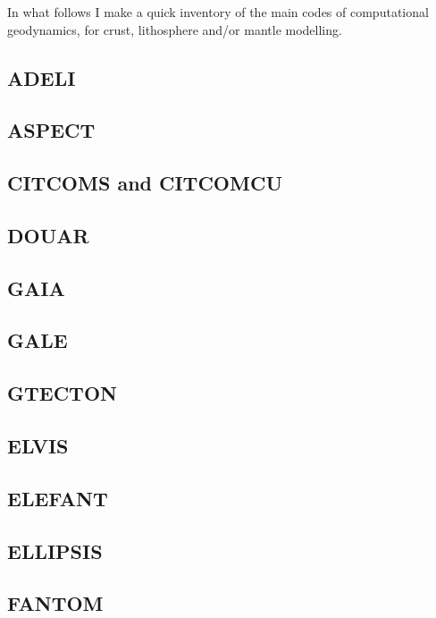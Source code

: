 
In what follows I make a quick inventory of the main codes of computational geodynamics, 
for crust, lithosphere and/or mantle modelling.

\subsection{ADELI}

\subsection{ASPECT}

\subsection{CITCOMS and CITCOMCU}

\subsection{DOUAR}

\subsection{GAIA}

\subsection{GALE}

\subsection{GTECTON}

\subsection{ELVIS}

\subsection{ELEFANT}

\subsection{ELLIPSIS}

\subsection{FANTOM}


